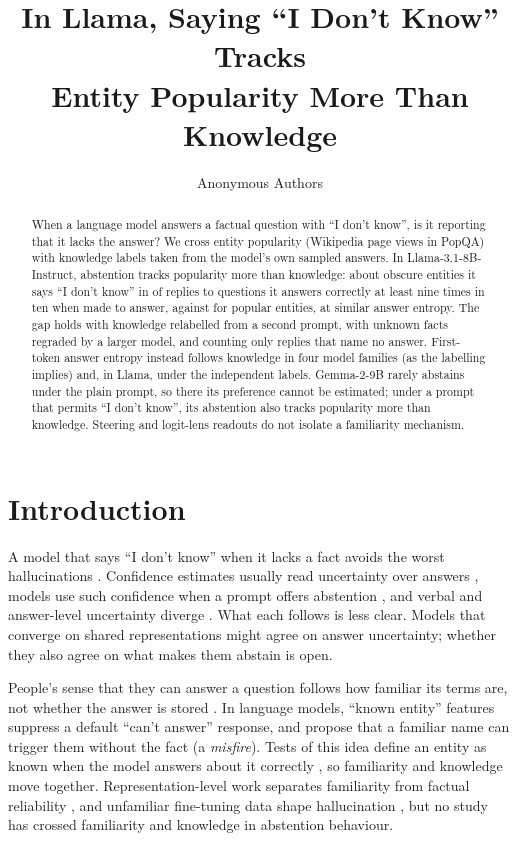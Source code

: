 \documentclass{article}
\title{In Llama, Saying ``I Don't Know'' Tracks\\Entity Popularity More Than Knowledge}
\author{Anonymous Authors}
\newcommand{\idk}{``I don't know''}
\begin{document}
\maketitle

\begin{abstract}
When a language model answers a factual question with \idk, is it reporting that it lacks the answer? We cross entity popularity (Wikipedia page views in PopQA) with knowledge labels taken from the model's own sampled answers. In Llama-3.1-8B-Instruct, abstention tracks popularity more than knowledge: about obscure entities it says \idk{} in \hmLlamaObsKnown{} of replies to questions it answers correctly at least nine times in ten when made to answer, against \hmLlamaPopKnown{} for popular entities, at similar answer entropy. The gap holds with knowledge relabelled from a second prompt, with unknown facts regraded by a larger model, and counting only replies that name no answer. First-token answer entropy instead follows knowledge in four model families (as the labelling implies) and, in Llama, under the independent labels. Gemma-2-9B rarely abstains under the plain prompt, so there its preference cannot be estimated; under a prompt that permits \idk, its abstention also tracks popularity more than knowledge. Steering and logit-lens readouts do not isolate a familiarity mechanism.
\end{abstract}

\section{Introduction}

A model that says \idk{} when it lacks a fact avoids the worst hallucinations \citep{kalai2025hallucinate}. Confidence estimates usually read uncertainty over answers \citep{kadavath2022know,kuhn2023semantic,stolfo2024confidence}, models use such confidence when a prompt offers abstention \citep{kumaran2026confidence}, and verbal and answer-level uncertainty diverge \citep{ji2025hedging}. What each follows is less clear. Models that converge on shared representations \citep{huh2024platonic} might agree on answer uncertainty; whether they also agree on what makes them abstain is open.

People's sense that they can answer a question follows how familiar its terms are, not whether the answer is stored \citep{reder1992,schwartz1992}. In language models, ``known entity'' features suppress a default ``can't answer'' response, and \citet{lindsey2025biology} propose that a familiar name can trigger them without the fact (a \emph{misfire}). Tests of this idea define an entity as known when the model answers about it correctly \citep{ferrando2025iknow}, so familiarity and knowledge move together. Representation-level work separates familiarity from factual reliability \citep{brzezinka2026bielik}, and unfamiliar fine-tuning data shape hallucination \citep{kang2025unfamiliar}, but no study has crossed familiarity and knowledge in abstention behaviour.
\end{document}
